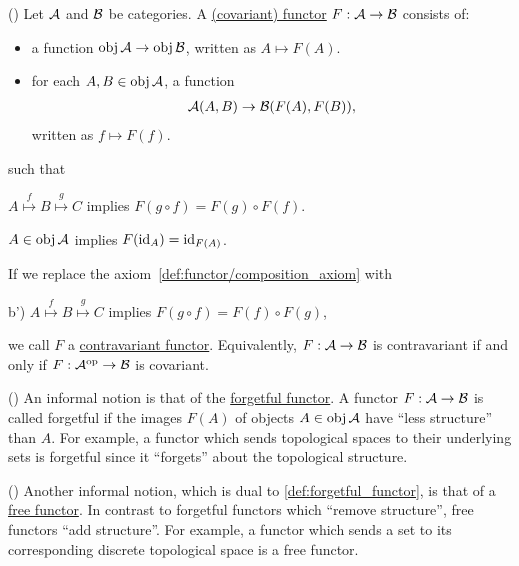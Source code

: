 \begin{definition}\label{def:functor}(\cite[definitions 1.2.1, 1.2.10]{Leinster2014})
  Let $\mathcal A$ and $\mathcal B$ be categories. A \uline{(covariant) functor} $F: \mathcal A \to \mathcal B$ consists of:
  \begin{itemize}
    \item a function $\operatorname{obj} \mathcal A \to \operatorname{obj} \mathcal B$, written as $A \mapsto F(A)$.
    \item for each $A, B \in \operatorname{obj} \mathcal A$, a function
    \begin{align*}
      \mathcal A(A, B) \to \mathcal B(F(A), F(B)),
    \end{align*}
    written as $f \mapsto F(f)$.
  \end{itemize}
  such that
  \begin{defenum}
    \item\label{def:functor/composition_axiom} $A \overset f \mapsto B \overset g \mapsto C$ implies $F(g \circ f) = F(g) \circ F(f)$.
    \item\label{def:functor/identity_axiom} $A \in \operatorname{obj} \mathcal A$ implies $F(\operatorname{id}_A) = \operatorname{id}_{F(A)}$.
  \end{defenum}

  If we replace the axiom~\cref{def:functor/composition_axiom} with
  \begin{defenum}
    \item[b')]\label{def:functor/contravariant_composition_axiom} $A \overset f \mapsto B \overset g \mapsto C$ implies $F(g \circ f) = F(f) \circ F(g)$,
  \end{defenum}
  we call $F$ a \uline{contravariant functor}. Equivalently, $F: \mathcal A \to \mathcal B$ is contravariant if and only if $F: \mathcal A^{\operatorname{op}} \to \mathcal B$ is covariant.
\end{definition}

\begin{definition}\label{def:forgetful_functor}(\cite[example 1.2.3]{Leinster2014})
  An informal notion is that of the \uline{forgetful functor}. A functor $F: \mathcal A \to \mathcal B$ is called forgetful if the images $F(A)$ of objects $A \in \operatorname{obj} \mathcal A$ have \enquote{less structure} than $A$. For example, a functor which sends topological spaces to their underlying sets is forgetful since it \enquote{forgets} about the topological structure.
\end{definition}

\begin{definition}\label{def:free_functor}(\cite[example 1.2.4]{Leinster2014})
  Another informal notion, which is dual to \cref{def:forgetful_functor}, is that of a \uline{free functor}. In contrast to forgetful functors which \enquote{remove structure}, free functors \enquote{add structure}. For example, a functor which sends a set to its corresponding discrete topological space is a free functor.
\end{definition}

